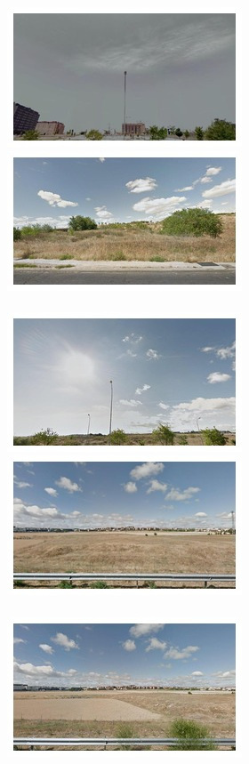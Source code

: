 \begin{figure}
  \begin{minipage}{\linewidth}
    \begin{minipage}{0.3\linewidth}
      \includegraphics[width=0.49\linewidth]{imgs/view/mosaicsV1/mosaic0000.jpg}
      \includegraphics[width=0.49\linewidth]{imgs/view/mosaicsV1/mosaic0001.jpg}
      \\ \vspace{-3mm} \\
      \includegraphics[width=0.49\linewidth]{imgs/view/mosaicsV1/mosaic0002.jpg}
      \includegraphics[width=0.49\linewidth]{imgs/view/mosaicsV1/mosaic0003.jpg}
      \\ \vspace{-3mm} \\
      \includegraphics[width=0.49\linewidth]{imgs/view/mosaicsV1/mosaic0004.jpg}

\end{minipage}
\end{minipage}
\end{figure}
